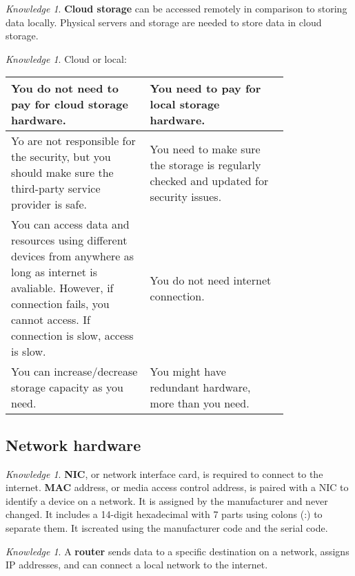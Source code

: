 \documentclass[8pt]{article}
\theoremstyle{remark}
\newtheorem{knowledge}[method]{Knowledge}
\begin{document}
            \begin{knowledge}
                \textbf{Cloud storage} can be accessed remotely in comparison to storing data locally. Physical servers and storage are needed to store data in cloud storage.
            \end{knowledge}

            \begin{knowledge}
                Cloud or local:
                \begin{center}
                    \begin{tabular}{p{0.4\linewidth}|p{0.4\linewidth}}
                        You do not need to pay for cloud storage hardware. & You need to pay for local storage hardware.\\\hline
                        Yo are not responsible for the security, but you should make sure the third-party service provider is safe. & You need to make sure the storage is regularly checked and updated for security issues.\\\hline
                        You can access data and resources using different devices from anywhere as long as internet is avaliable. However, if connection fails, you cannot access. If connection is slow, access is slow. & You do not need internet connection.\\\hline
                        You can increase/decrease storage capacity as you need. & You might have redundant hardware, more than you need.
                    \end{tabular}
                \end{center}
            \end{knowledge}

        \subsection{Network hardware}
            \begin{knowledge}
                \textbf{NIC}, or network interface card, is required to connect to the internet. \textbf{MAC} address, or media access control address, is paired with a NIC to identify a device on a network. It is assigned by the manufacturer and never changed. It includes a 14-digit hexadecimal with 7 parts using colons (:) to separate them. It iscreated using the manufacturer code and the serial code. 
            \end{knowledge}

            \begin{knowledge}
                A \textbf{router} sends data to a specific destination on a network, assigns IP addresses, and can connect a local network to the
                internet.
            \end{knowledge}
\end{document}
